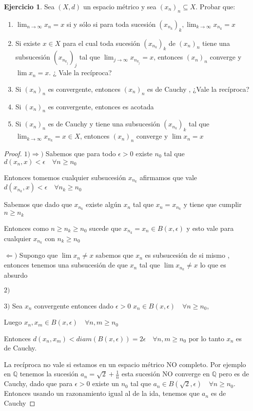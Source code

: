 \documentclass[12pt]{article}
\newcommand{\Q}{\mathbb{Q}}
\newcommand{\Ra}{\Rightarrow}
\newcommand{\ra}{\rightarrow}
\theoremstyle{definition}
\newtheorem{ej}{Ejercicio}
\begin{document}
\begin{ej}
  Sea $(X,d)$ un espacio métrico y sea $(x_n)_n \subseteq X$. Probar que:
  \begin{enumerate}
    \item $\lim_{n \ra \infty} x_n = x$ si y sólo si para toda sucesión $(x_{n_k})_k, \lim_{k \ra \infty} x_{n_k}= x$
    \item Si existe $x \in X$ para el cual toda sucesión $(x_{n_k})_k$ de $(x_n)_n$ tiene una subsucesión $(x_{n_{k_j}})_j$ tal que $\lim_{j \ra \infty}x_{n_{k_j}} = x$, entonces $(x_n)_n$ converge y $\lim x_n = x$. ¿ Vale la recíproca?
    \item Si $(x_n)_n$ es convergente, entonces $(x_n)_n$ es de Cauchy , ¿Vale la recíproca?
     \item Si $(x_n)_n$ es convergente, entonces es acotada
     \item Si $(x_n)_n$ es de Cauchy y tiene una subsucesión $(x_{n_k})_k$ tal que $\lim_{k \ra \infty} x_{n_k} = x \in X$, entonces $(x_n)_n$ converge y $\lim x_n = x$
  \end{enumerate}
  \begin{proof}
$1) \Ra)$ Sabemos que para todo $\epsilon > 0$ existe $n_0$ tal que $d(x_n,x) < \epsilon \quad \forall n \geq n_0$

Entonces tomemos cualquier subsucesión $x_{n_k}$ afirmamos que vale $d(x_{n_k},x) < \epsilon \quad \forall n_k \geq n_0$ 

Sabemos que dado que $x_{n_k}$ existe algún $ x_n$ tal que $x_n = x_{n_k}$ y tiene que cumplir $n \geq n_k$ 

Entonces como $n \geq n_k \geq n_0$ sucede que $x_{n_k} = x_n \in B(x,\epsilon)$ y esto vale para cualquier $x_{n_k}$ con $n_k \geq n_0$

$\Leftarrow )$ Supongo que $\lim x_n \neq x$ sabemos que $x_n$ es subsucesión de si mismo , entonces tenemos una subsucesión de que $x_n$ tal que $\lim x_{n_k} \neq x$ lo que es absurdo

$2)$ 

$3)$ Sea $x_n$ convergente entonces dado $\epsilon > 0$ $x_n \in B(x,\epsilon) \quad \forall n \geq n_0$, 

Luego $x_n , x_m \in B(x,\epsilon) \quad \forall n,m \geq n_0$ 

Entonces $d(x_n,x_m) < diam(B(x,\epsilon)) = 2\epsilon \quad \forall n,m \geq n_0$ por lo tanto $x_n$ es de Cauchy.

La recíproca no vale si estamos en un espacio métrico NO completo. Por ejemplo en $\Q$ tenemos la sucesión $a_n = \sqrt{2} + \frac{1}{n}$ esta sucesión NO converge en $\Q$ pero es de Cauchy, dado que para $\epsilon > 0$ existe un $n_0$ tal que $a_n \in B(\sqrt{2},\epsilon) \quad \forall n \geq n_0$. Entonces usando un razonamiento igual al de la ida, tenemos que $a_n$ es de Cauchy


\end{proof}
\end{ej}
\end{document}
